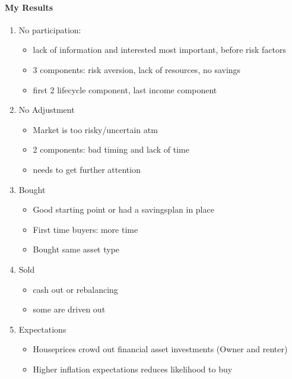 \documentclass[ProjectABM]{subfiles}
\begin{document}
\paragraph{My Results}
\begin{enumerate}
	\item No participation:
	\begin{itemize}
		\item lack of information and interested most important, before risk factors
		\item 3 components: risk aversion, lack of resources, no savings
		\item first 2 lifecycle component, last income component
	\end{itemize}
	\item No Adjustment
	\begin{itemize}
		\item Market is too risky/uncertain atm
		\item 2 components: bad timing and lack of time
		\item needs to get further attention
	\end{itemize}
	\item Bought
	\begin{itemize}
		\item Good starting point or had a savingsplan in place
		\item First time buyers: more time
		\item Bought same asset type
	\end{itemize}
	\item Sold
	\begin{itemize}
		\item cash out or rebalancing
		\item some are driven out
	\end{itemize}
	\item Expectations
	\begin{itemize}
		\item Houseprices crowd out financial asset investments (Owner and renter)
		\item Higher inflation expectations reduces likelihood to buy
	\end{itemize}
\end{enumerate}
\end{document}
